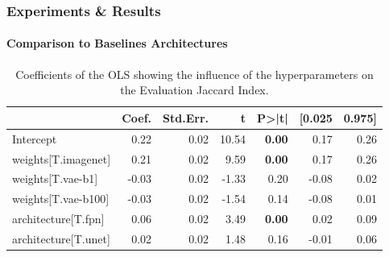 \documentclass[t,aspectratio=169]{beamer}
\begin{document}
\begin{frame}[fragile]
  \frametitle{Experiments \& Results}
  \framesubtitle{Comparison to Baselines Architectures}
  \vspace*{-0.5cm}
  \begin{table}
    \centering
    \caption{Coefficients of the OLS showing the influence of the hyperparameters on the Evaluation Jaccard Index.}
    \color{black}
    \begin{tabular}{lrrrrrr}
      \toprule
                           & Coef. & Std.Err. & t     & P>|t|         & [0.025 & 0.975] \\
      \midrule
      Intercept            & 0.22  & 0.02     & 10.54 & \textbf{0.00} & 0.17   & 0.26   \\
      weights[T.imagenet]  & 0.21  & 0.02     & 9.59  & \textbf{0.00} & 0.17   & 0.26   \\
      weights[T.vae-b1]    & -0.03 & 0.02     & -1.33 & 0.20          & -0.08  & 0.02   \\
      weights[T.vae-b100]  & -0.03 & 0.02     & -1.54 & 0.14          & -0.08  & 0.01   \\
      architecture[T.fpn]  & 0.06  & 0.02     & 3.49  & \textbf{0.00} & 0.02   & 0.09   \\
      architecture[T.unet] & 0.02  & 0.02     & 1.48  & 0.16          & -0.01  & 0.06   \\
      \bottomrule
    \end{tabular}
  \end{table}
  
\end{frame}
\end{document}
